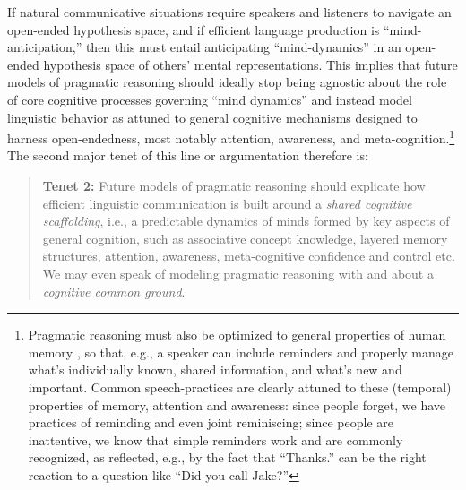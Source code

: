 \documentclass[fleqn,reqno,12pt]{article}
\newcommand{\real}{\acro{real}}
\begin{document}
If natural communicative situations require speakers and listeners to navigate an open-ended hypothesis space, and if efficient language production is ``mind-anticipation,'' then this must entail anticipating ``mind-dynamics'' in an open-ended hypothesis space of others' mental representations.
This implies that future models of pragmatic reasoning should ideally stop being agnostic about the role of core cognitive processes governing ``mind dynamics'' and instead model \real linguistic behavior as attuned to general cognitive mechanisms designed to harness open-endedness, most notably attention, awareness, and meta-cognition.\footnote{
  Pragmatic reasoning must also be optimized to general properties of human memory \citep[cf.,][]{Rubio-FernandezBerke2025:Tracking-minds-}, so that, e.g., a speaker can include reminders and properly manage what's individually known, shared information, and what's new and important.
  Common speech-practices are clearly attuned to these (temporal) properties of memory, attention and awareness: since people forget, we have practices of reminding and even joint reminiscing; since people are inattentive, we know that simple reminders work and are commonly recognized, as reflected, e.g., by the fact that “Thanks.” can be the right reaction to a question like “Did you call Jake?”
}
The second major tenet of this line or argumentation therefore is:
\begin{quote}
  \textbf{Tenet 2:}
  Future models of pragmatic reasoning should explicate how efficient linguistic communication is built around a \emph{shared cognitive scaffolding}, i.e., a predictable dynamics of minds formed by key aspects of general cognition, such as associative concept knowledge, layered memory structures, attention, awareness, meta-cognitive confidence and control etc.
  We may even speak of modeling pragmatic reasoning with and about a \emph{cognitive common ground}.
\end{quote}
\end{document}
